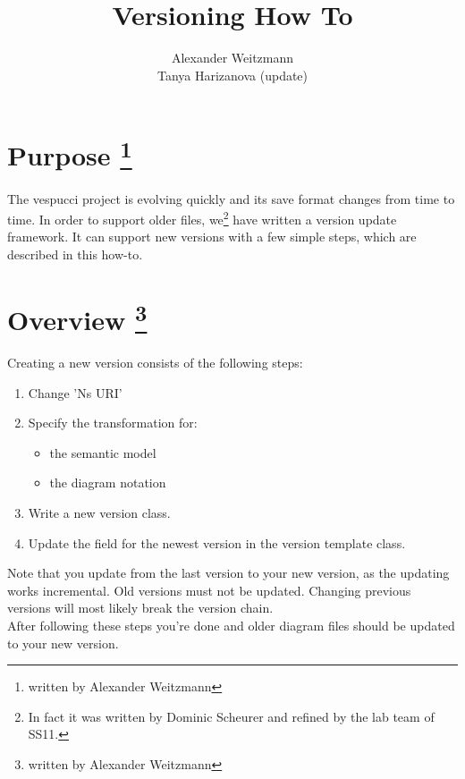 \documentclass[12pt,a4paper,oneside]{report}
\author{Alexander Weitzmann \\ Tanya Harizanova (update)}
\title{Versioning How To}
\begin{document}
\thispagestyle{empty}
\maketitle

\section*{Purpose \footnote{written by Alexander Weitzmann}}
The vespucci project is evolving quickly and its save format changes from time to time. In order to support older files, we\footnote{In fact it was written by Dominic Scheurer and refined by the lab team of SS11.} have written a version update framework. It can support new versions with a few simple steps, which are described in this how-to.

\section*{Overview \footnote{written by Alexander Weitzmann}}
Creating a new version consists of the following steps:\\
\begin{enumerate}
	\item Change 'Ns URI'
	\item Specify the transformation for:
	\begin{itemize}
		\item the semantic model
		\item the diagram notation
	\end{itemize}
	\item Write a new version class.
	\item Update the field for the newest version in the version template class.
	
\end{enumerate}
\medskip
Note that you update from the last version to your new version, as the updating works incremental. Old versions must not be updated. Changing previous versions will most likely break the version chain.\\
After following these steps you're done and older diagram files should be updated to your new version. 
\newpage
\end{document}
